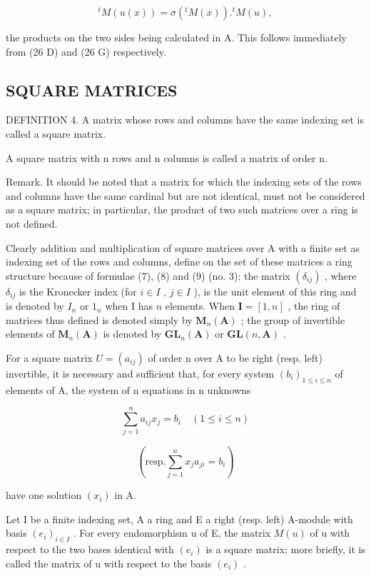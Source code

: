 \[
{ } ^ { t } M ( u ( x ) ) = \sigma ( { } ^ { t } M ( x ) ) . { } ^ { t } M ( u ) ,\tag{17 DG}
\]

the products on the two sides being calculated in A. This follows immediately from (26 D) and (26 G) respectively.

\subsection{SQUARE MATRICES}

DEFINITION 4. A matrix whose rows and columns have the same indexing set is called a square matrix.

A square matrix with n rows and n columns is called a matrix of order n.

Remark. It should be noted that a matrix for which the indexing sets of the rows and columns have the same cardinal but are not identical, must not be considered as a square matrix; in particular, the product of two such matrices over a ring is not defined.

Clearly addition and multiplication of square matrices over A with a finite set as indexing set of the rows and columns, define on the set of these matrices a ring structure because of formulae (7), (8) and (9) (no. 3); the matrix \((\delta_{ij})\) , where \(\delta_{ij}\) is the Kronecker index (for \(i \in I\) , \(j \in I\) ), is the unit element of this ring and is denoted by \(I_n\) or \(1_n\) when I has \(n\) elements. When \(\mathbf{I} = [1, n]\) , the ring of matrices thus defined is denoted simply by \(\mathbf{M}_n(\mathbf{A})\) ; the group of invertible elements of \(\mathbf{M}_n(\mathbf{A})\) is denoted by \(\mathbf{GL}_n(\mathbf{A})\) or \(\mathbf{GL}(n, \mathbf{A})\) .

For a square matrix \(U = (a_{ij})\) of order n over A to be right (resp. left) invertible, it is necessary and sufficient that, for every system \((b_i)_{1 \leq i \leq n}\) of elements of A, the system of n equations in n unknowns

\[
\sum_ {j = 1} ^ {n} a _ {i j} x _ {j} = b _ {i} \quad (1 \leqslant i \leqslant n)
\]

\[
\left(\text {resp.} \sum_ {j = 1} ^ {n} x _ {j} a _ {j i} = b _ {i}\right)
\]

have one solution \((x_{i})\) in A.

Let I be a finite indexing set, A a ring and E a right (resp. left) A-module with basis \((e_{i})_{i\in I}\) . For every endomorphism u of E, the matrix \(M(u)\) of u with respect to the two bases identical with \((e_{i})\) is a square matrix; more briefly, it is called the matrix of u with respect to the basis \((e_{i})\) .

